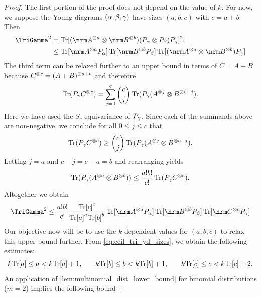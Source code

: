 \documentclass[notitlepage, 10pt]{article}
\begin{document}
\begin{proof}
    The first portion of the proof does not depend on the value of $k$.
    For now, we suppose the Young diagrams $(\alpha,\beta,\gamma)$ have sizes $(a,b,c)$ with $c=a+b$.
    Then
    \begin{align}
        \TriGamma^2 
        &= \Tr[(\nrm A^{\ot a} \ot \nrm B^{\ot b}) (P_{\ya} \ot P_{\yb}) P_{\yc}]^2, \\
        &\leq \Tr[\nrm A^{\ot a}P_{\ya}]\Tr[\nrm B^{\ot b}P_{\yb}]\Tr[(\nrm A^{\ot a} \ot \nrm B^{\ot b})P_{\yc}]
    \end{align}
    The third term can be relaxed further to an upper bound in terms of $C = A+B$ because $C^{\otimes c} = (A+B)^{\otimes a+b}$ and therefore 
    \begin{equation}
        \operatorname{Tr}(P_{\gamma} C^{\otimes c}) = \sum_{j=0}^{c} \binom{c}{j} \operatorname{Tr}(P_{\gamma} (A^{\otimes j} \otimes B^{\otimes c-j}).
    \end{equation}
    Here we have used the $S_{c}$-equivariance of $P_{\gamma}$.
    Since each of the summands above are non-negative, we conclude for all $0 \leq j \leq c$ that
    \begin{equation}
        \operatorname{Tr}(P_{\gamma} C^{\otimes c}) \geq \binom{c}{j} \operatorname{Tr}(P_{\gamma} (A^{\otimes j} \otimes B^{\otimes c-j}).
    \end{equation}
    Letting $j = a$ and $c-j=c-a=b$ and rearranging yields
    \begin{equation}
        \operatorname{Tr}(P_{\gamma} (A^{\otimes a} \otimes B^{\otimes b})) \leq \frac{a!b!}{c!}\operatorname{Tr}(P_{\gamma} C^{\otimes c}).
    \end{equation}
    Altogether we obtain
    \begin{align}
        \label{eq:tri_gamma_abc_upper_bound}
        \TriGamma^2 
        \leq \frac{a!b!}{c!} \frac{{\tec}^{c}}{{\tea}^a{\teb}^{b}} \Tr[\nrm A^{\ot a}P_{\ya}]\Tr[\nrm B^{\ot b}P_{\yb}]\Tr[\nrm C^{\ot c} P_{\yc}]
    \end{align}
    Our objective now will be to use the $k$-dependent values for $(a,b,c)$ to relax this upper bound further.
    From \cref{eq:ceil_tri_yd_sizes}, we obtain the following estimates:
    \begin{equation}
        \begin{alignedat}{3}
            &k {\operatorname{Tr}[a]} \leq a < k {\operatorname{Tr}[a]} + 1, \qquad
            &&k {\operatorname{Tr}[b]} \leq b < k {\operatorname{Tr}[b]} + 1, \qquad
            &&k {\operatorname{Tr}[c]} \leq c < k {\operatorname{Tr}[c]} + 2.
        \end{alignedat}
    \end{equation}
    An application of \cref{lem:multinomial_dist_lower_bound} for binomial distributions ($m=2$) implies the following bound

\end{proof}
\end{document}
